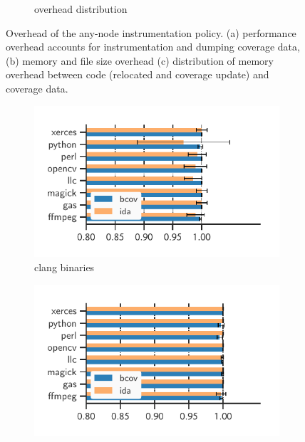 \begin{figure}[t!]
\begin{subfigure}[t]{0.3\textwidth}
		\caption{overhead distribution}
		\label{fig:overhead-dist}
	\end{subfigure}
	
	\caption{Overhead of the any-node instrumentation policy. (a) performance overhead accounts for instrumentation and dumping coverage data, (b) memory and file size overhead (c) distribution of memory overhead between code (relocated  and coverage update) and coverage data. }
	\label{fig:overhead-results}
\end{figure}



\begin{figure}[t!]
	\centering
	\small
	\begin{subfigure}[t]{0.27\textwidth}
		\includegraphics[clip, trim=0.48cm 0.4cm 1.71cm 0.65cm, width=\textwidth]{fig/jumptab-clang}
		\caption{\textsf{clang} binaries}
		\label{fig:jumptab-clang}
	\end{subfigure}
	\hspace{10pt}
	\begin{subfigure}[t]{0.28\textwidth}
		\includegraphics[clip, trim=0.48cm 0.4cm 1.6cm 0.65cm, width=\textwidth]{fig/jumptab-gcc}

\end{subfigure}
\end{figure}

